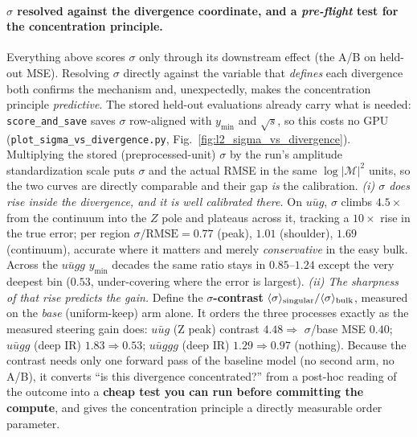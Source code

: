 \documentclass[11pt]{article}
\newcommand{\code}[1]{\texttt{#1}}
\begin{document}
\paragraph{$\sigma$ resolved against the divergence coordinate, and a \emph{pre-flight} test for
the concentration principle.} Everything above scores $\sigma$ only through its downstream effect (the
A/B on held-out MSE). Resolving $\sigma$ directly against the variable that \emph{defines} each
divergence both confirms the mechanism and, unexpectedly, makes the concentration principle
\emph{predictive}. The stored held-out evaluations already carry what is needed: \code{score\_and\_save}
saves $\sigma$ row-aligned with $y_{\min}$ and $\sqrt s$, so this costs no GPU
(\code{plot\_sigma\_vs\_divergence.py}, Fig.~\ref{fig:l2_sigma_vs_divergence}). Multiplying the stored
(preprocessed-unit) $\sigma$ by the run's amplitude standardization scale puts $\sigma$ and the actual
RMSE in the same $\log|\mathcal M|^2$ units, so the two curves are directly comparable and their gap
\emph{is} the calibration. \emph{(i) $\sigma$ does rise inside the divergence, and it is well calibrated
there.} On $u\bar u g$, $\sigma$ climbs $4.5\times$ from the continuum into the $Z$ pole and plateaus
across it, tracking a $10\times$ rise in the true error; per region $\sigma/\mathrm{RMSE}=0.77$ (peak),
$1.01$ (shoulder), $1.69$ (continuum), accurate where it matters and merely \emph{conservative} in the
easy bulk. Across the $u\bar ugg$ $y_{\min}$ decades the same ratio stays in $0.85$--$1.24$ except the
very deepest bin ($0.53$, under-covering where the error is largest). \emph{(ii) The sharpness of that
rise predicts the gain.} Define the \textbf{$\sigma$-contrast} $\langle\sigma\rangle_{\rm
singular}/\langle\sigma\rangle_{\rm bulk}$, measured on the \emph{base} (uniform-keep) arm alone. It
orders the three processes exactly as the measured steering gain does: $u\bar u g$ (Z peak) contrast
$4.48\Rightarrow$ $\sigma$/base MSE $0.40$; $u\bar u gg$ (deep IR) $1.83\Rightarrow0.53$; $u\bar u ggg$
(deep IR) $1.29\Rightarrow0.97$ (nothing). Because the contrast needs only one forward pass of the
baseline model (no second arm, no A/B), it converts ``is this divergence concentrated?'' from a
post-hoc reading of the outcome into a \textbf{cheap test you can run before committing the compute},
and gives the concentration principle a directly measurable order parameter.
\end{document}
